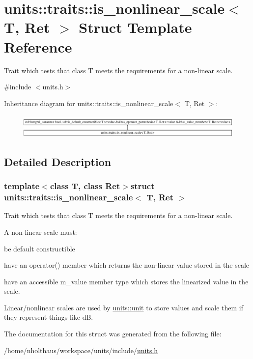 \hypertarget{structunits_1_1traits_1_1is__nonlinear__scale}{}\section{units\+:\+:traits\+:\+:is\+\_\+nonlinear\+\_\+scale$<$ T, Ret $>$ Struct Template Reference}
\label{structunits_1_1traits_1_1is__nonlinear__scale}


Trait which tests that {\ttfamily class T} meets the requirements for a non-\/linear scale.  




{\ttfamily \#include $<$units.\+h$>$}

Inheritance diagram for units\+:\+:traits\+:\+:is\+\_\+nonlinear\+\_\+scale$<$ T, Ret $>$\+:\begin{figure}[H]
\begin{center}
\leavevmode
\includegraphics[height=1.230769cm]{structunits_1_1traits_1_1is__nonlinear__scale}
\end{center}
\end{figure}


\subsection{Detailed Description}
\subsubsection*{template$<$class T, class Ret$>$struct units\+::traits\+::is\+\_\+nonlinear\+\_\+scale$<$ T, Ret $>$}

Trait which tests that {\ttfamily class T} meets the requirements for a non-\/linear scale. 

A non-\/linear scale must\+:
\begin{DoxyItemize}
\item be default constructible
\item have an {\ttfamily operator()} member which returns the non-\/linear value stored in the scale
\item have an accessible {\ttfamily m\+\_\+value} member type which stores the linearized value in the scale.
\end{DoxyItemize}

Linear/nonlinear scales are used by {\ttfamily \hyperlink{structunits_1_1unit}{units\+::unit}} to store values and scale them if they represent things like d\+B. 

The documentation for this struct was generated from the following file\+:\begin{DoxyCompactItemize}
\item 
/home/nholthaus/workspace/units/include/\hyperlink{units_8h}{units.\+h}\end{DoxyCompactItemize}
